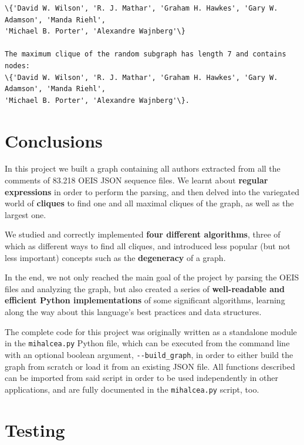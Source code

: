 \documentclass[11pt]{article}
\begin{document}
    \begin{Verbatim}[commandchars=\\\{\}]
\{'David W. Wilson', 'R. J. Mathar', 'Graham H. Hawkes', 'Gary W. Adamson', 'Manda Riehl',
'Michael B. Porter', 'Alexandre Wajnberg'\}

The maximum clique of the random subgraph has length 7 and contains nodes:
\{'David W. Wilson', 'R. J. Mathar', 'Graham H. Hawkes', 'Gary W. Adamson', 'Manda Riehl',
'Michael B. Porter', 'Alexandre Wajnberg'\}.
    \end{Verbatim}

\section{Conclusions}\label{conclusions}

In this project we built a graph containing all authors extracted from
all the comments of 83.218 OEIS JSON sequence files. We learnt about
\textbf{regular expressions} in order to perform the parsing, and then
delved into the variegated world of \textbf{cliques} to find one and all
maximal cliques of the graph, as well as the largest one.

We studied and correctly implemented \textbf{four different algorithms},
three of which as different ways to find all cliques, and introduced
less popular (but not less important) concepts such as the
\textbf{degeneracy} of a graph.

In the end, we not only reached the main goal of the project by parsing
the OEIS files and analyzing the graph, but also created a series of
\textbf{well-readable and efficient Python implementations} of some
significant algorithms, learning along the way about this language's
best practices and data structures.

The complete code for this project was originally written as a
standalone module in the \texttt{mihalcea.py} Python file, which can be
executed from the command line with an optional boolean argument,
\texttt{-\/-build\_graph}, in order to either build the graph from
scratch or load it from an existing JSON file. All functions described
can be imported from said script in order to be used independently in
other applications, and are fully documented in the \texttt{mihalcea.py}
script, too.

\section{Testing}\label{testing}
\end{document}
